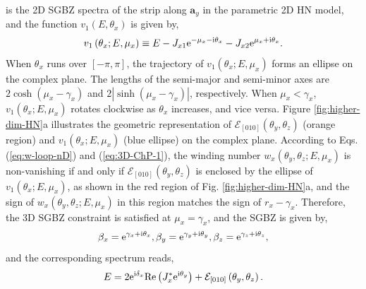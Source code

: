 is the 2D SGBZ spectra of the strip along $\mathbf{a}_{y}$ in the
parametric 2D HN model, and the function $v_{1}(E,\theta_{x})$ is
given by, 
\begin{equation}
v_{1}\left(\theta_{x};E,\mu_{x}\right)\equiv E-J_{x1}\mathrm{e}^{-\mu_{x}-\mathrm{i}\theta_{x}}-J_{x2}\mathrm{e}^{\mu_{x}+\mathrm{i}\theta_{x}}.
\end{equation}
When $\theta_{x}$ runs over $\left[-\pi,\pi\right]$, the trajectory
of $v_{1}(\theta_{x};E,\mu_{x})$ forms an ellipse on the complex
plane. The lengths of the semi-major and semi-minor axes are $2\cosh(\mu_{x}-\gamma_{x})$
and $2|\sinh(\mu_{x}-\gamma_{x})|$, respectively. When $\mu_{x}<\gamma_{x}$,
$v_{1}(\theta_{x};E,\mu_{x})$ rotates clockwise as $\theta_{x}$
increases, and vice versa. Figure \ref{fig:higher-dim-HN}a illustrates
the geometric representation of $\mathcal{E}_{[010]}(\theta_{y},\theta_{z})$
(orange region) and $v_{1}(\theta_{x};E,\mu_{x})$ (blue ellipse)
on the complex plane. According to Eqs. (\ref{eq:w-loop-nD}) and
(\ref{eq:3D-ChP-1}), the winding number $w_{x}(\theta_{y},\theta_{z};E,\mu_{x})$
is non-vanishing if and only if $\mathcal{E}_{[010]}(\theta_{y},\theta_{z})$
is enclosed by the ellipse of $v_{1}(\theta_{x};E,\mu_{x})$, as shown
in the red region of Fig. \ref{fig:higher-dim-HN}a, and the sign
of $w_{x}(\theta_{y},\theta_{z};E,\mu_{x})$ in this region matches
the sign of $r_{x}-\gamma_{x}$. Therefore, the 3D SGBZ constraint
is satisfied at $\mu_{x}=\gamma_{x}$, and the SGBZ is given by, 
\begin{equation}
\beta_{x}=\mathrm{e}^{\gamma_{x}+\mathrm{i}\theta_{x}},\beta_{y}=\mathrm{e}^{\gamma_{y}+\mathrm{i}\theta_{y}},\beta_{z}=\mathrm{e}^{\gamma_{z}+\mathrm{i}\theta_{z}},
\end{equation}
and the corresponding spectrum reads, 
\begin{equation}
E=2\mathrm{e}^{\mathrm{i}\delta_{x}}\text{Re}\left(J_{x}^{*}\mathrm{e}^{\mathrm{i}\theta_{y}}\right)+\mathcal{E}_{[010]}\left(\theta_{y},\theta_{z}\right).
\end{equation}

